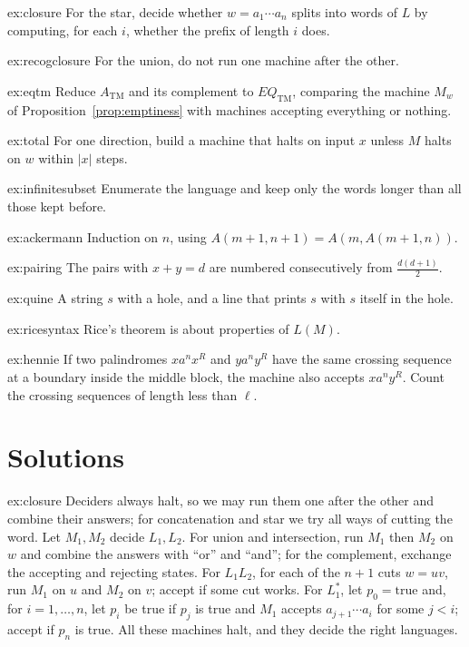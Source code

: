 \begin{hint}{ex:closure}
For the star, decide whether $w=a_1\cdots a_n$ splits into words of $L$ by computing, for each $i$, whether the prefix of length $i$ does.
\end{hint}
\begin{hint}{ex:recogclosure}
For the union, do not run one machine after the other.
\end{hint}
\begin{hint}{ex:eqtm}
Reduce $A_{\mathrm{TM}}$ and its complement to $EQ_{\mathrm{TM}}$, comparing the machine $M_w$ of Proposition~\ref{prop:emptiness} with machines accepting everything or nothing.
\end{hint}
\begin{hint}{ex:total}
For one direction, build a machine that halts on input $x$ unless $M$ halts on $w$ within $|x|$ steps.
\end{hint}
\begin{hint}{ex:infinitesubset}
Enumerate the language and keep only the words longer than all those kept before.
\end{hint}
\begin{hint}{ex:ackermann}
Induction on $n$, using $A(m+1,n+1)=A(m,A(m+1,n))$.
\end{hint}
\begin{hint}{ex:pairing}
The pairs with $x+y=d$ are numbered consecutively from $\frac{d(d+1)}2$.
\end{hint}
\begin{hint}{ex:quine}
A string $s$ with a hole, and a line that prints $s$ with $s$ itself in the hole.
\end{hint}
\begin{hint}{ex:ricesyntax}
Rice's theorem is about properties of $L(M)$.
\end{hint}
\begin{hint}{ex:hennie}
If two palindromes $xa^nx^R$ and $ya^ny^R$ have the same crossing sequence at a boundary inside the middle block, the machine also accepts $xa^ny^R$. Count the crossing sequences of length less than $\ell$.
\end{hint}

\section{Solutions}

\begin{solution}{ex:closure}
\idea Deciders always halt, so we may run them one after the other and combine their answers; for concatenation and star we try all ways of cutting the word.
\writeup Let $M_1,M_2$ decide $L_1,L_2$. For union and intersection, run $M_1$ then $M_2$ on $w$ and combine the answers with ``or'' and ``and''; for the complement, exchange the accepting and rejecting states. For $L_1L_2$, for each of the $n+1$ cuts $w=uv$, run $M_1$ on $u$ and $M_2$ on $v$; accept if some cut works. For $L_1^*$, let $p_0=\text{true}$ and, for $i=1,\dots,n$, let $p_i$ be true if $p_j$ is true and $M_1$ accepts $a_{j+1}\cdots a_i$ for some $j<i$; accept if $p_n$ is true. All these machines halt, and they decide the right languages.
\end{solution}


